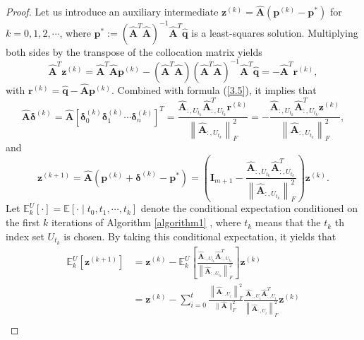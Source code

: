 \documentclass[11pt]{article}
\numberwithin{equation}{section}
\begin{document}
\begin{proof}
Let us introduce an auxiliary intermediate $\boldsymbol{z}^{(k)}=\hat{\boldsymbol{A}}\left(\boldsymbol{p}^{(k)}-\boldsymbol{p}^{*}\right)$ for $k=0,1,2, \cdots$, where $\boldsymbol{p}^{*}:=\left(\hat{\boldsymbol{A}}^{T} \hat{\boldsymbol{A}}\right)^{-1} \hat{\boldsymbol{A}}^{T} \hat{\boldsymbol{q}}$ is a least-squares solution. Multiplying both sides by the transpose of the collocation matrix yields
$$
\hat{\boldsymbol{A}}^{T} \boldsymbol{z}^{(k)}=\hat{\boldsymbol{A}}^{T} \hat{\boldsymbol{A}} \boldsymbol{p}^{(k)}-\left(\hat{\boldsymbol{A}}^{T} \hat{\boldsymbol{A}}\right)\left(\hat{\boldsymbol{A}}^{T} \hat{\boldsymbol{A}}\right)^{-1} \hat{\boldsymbol{A}}^{T} \hat{\boldsymbol{q}}=-\hat{\boldsymbol{A}}^{T} \boldsymbol{r}^{(k)},
$$
with $\boldsymbol{r}^{(k)}=\hat{\boldsymbol{q}}-\hat{\boldsymbol{A}} \boldsymbol{p}^{(k)}$. Combined with formula (\ref{3.5}), it implies that
$$
\hat{\boldsymbol{A}} \boldsymbol{\delta}^{(k)}=\hat{\boldsymbol{A}}\left[\boldsymbol{\delta}_{0}^{(k)} \boldsymbol{\delta}_{1}^{(k)} \cdots \boldsymbol{\delta}_{n}^{(k)}\right]^{T}=\frac{\hat{\boldsymbol{A}}_{:, U_{t_{k}}} \hat{\boldsymbol{A}}_{:, U_{t_{k}}}^{T} \boldsymbol{r}^{(k)}}{\left\|\hat{\boldsymbol{A}}_{:, U_{t_{k}}}\right\|_{F}^{2}}=-\frac{\hat{\boldsymbol{A}}_{:, U_{t_{k}}} \hat{\boldsymbol{A}}_{:, U_{t_{k}}}^{T} \boldsymbol{z}^{(k)}}{\left\|\hat{\boldsymbol{A}}_{:, U_{t_{k}}}\right\|_{F}^{2}},
$$
and
$$
\boldsymbol{z}^{(k+1)}=\hat{\boldsymbol{A}}\left(\boldsymbol{p}^{(k)}+\boldsymbol{\delta}^{(k)}-\boldsymbol{p}^{*}\right)=\left(\boldsymbol{I}_{m+1}-\frac{\hat{\boldsymbol{A}}_{:, U_{t_{k}}} \hat{\boldsymbol{A}}_{:, U_{t_{k}}}^{T}}{\left\|\hat{\boldsymbol{A}}_{:, U_{t_{k}}}\right\|_{F}^{2}}\right) \boldsymbol{z}^{(k)}.
$$
Let $\mathbb{E}_{k}^{U}[\cdot]=\mathbb{E}\left[\cdot \mid t_{0}, t_{1}, \cdots, t_{k}\right]$ denote the conditional expectation conditioned on the first $k$ iterations of Algorithm \ref{algorithm1} , where $t_{k}$ means that the $t_{k}$ th index set $U_{t_{k}}$ is chosen. By taking this conditional expectation, it yields that
$$
\begin{aligned}
\mathbb{E}_k^U\left[\boldsymbol{z}^{(k+1)}\right] & =\boldsymbol{z}^{(k)}-\mathbb{E}_k^U\left[\frac{\hat{\boldsymbol{A}}_{:, U_{t_k}} \hat{\boldsymbol{A}}_{:, U_{t_k}}^T}{\left\|\hat{\boldsymbol{A}}_{:, U_{t_k}}\right\|_F^2}\right] \boldsymbol{z}^{(k)} \\
& =\boldsymbol{z}^{(k)}-\sum_{i=0}^t \frac{\left\|\hat{\boldsymbol{A}}_{:, U_i}\right\|_F^2}{\|\hat{\boldsymbol{A}}\|_F^2} \frac{\hat{\boldsymbol{A}}_{:, U_i} \hat{\boldsymbol{A}}_{:, U_i}^T}{\left\|\hat{\boldsymbol{A}}_{:, U_i}\right\|_F^2} \boldsymbol{z}^{(k)} \\

\end{aligned}$$
\end{proof}
\end{document}
